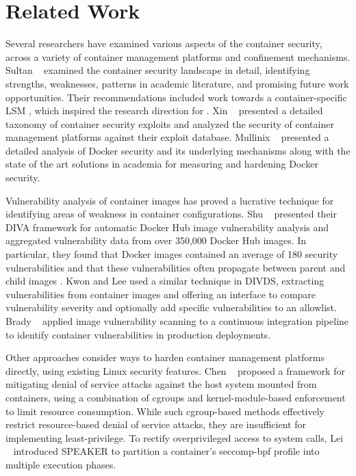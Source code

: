 \section{Related Work}

Several researchers \cite{sultan2019_container_security,xin2018_container_security,mullinix2020_security_measures} have examined various aspects of the container security, across a variety of container management platforms and confinement mechanisms. Sultan \etal~\cite{sultan2019_container_security} examined the container security landscape in detail, identifying strengths, weaknesses, patterns in academic literature,  and promising future work opportunities. Their recommendations included work towards a container-specific LSM \cite{sultan2019_container_security}, which inspired the research direction for \bpfcontain{}. Xin \etal~\cite{xin2018_container_security} presented a detailed taxonomy of container security exploits and analyzed the security of container management platforms against their exploit database. Mullinix \etal~\cite{mullinix2020_security_measures} presented a detailed analysis of Docker security and its underlying mechanisms along with the state of the art solutions in academia for measuring and hardening Docker security.

Vulnerability analysis of container images \cite{shu2017_image_vuln,kwon2020_divds,brady2020_docker_cloud} has proved a lucrative technique for identifying areas of weakness in container configurations. Shu \etal~\cite{shu2017_image_vuln} presented their DIVA framework for automatic Docker Hub image vulnerability analysis and aggregated vulnerability data from over 350,000 Docker Hub images. In particular, they found that Docker images contained an average of 180 security vulnerabilities and that these vulnerabilities often propagate between parent and child images \cite{shu2017_image_vuln}. Kwon and Lee \cite{kwon2020_divds} used a similar technique in DIVDS, extracting vulnerabilities from container images and offering an interface to compare vulnerability severity and optionally add specific vulnerabilities to an allowlist. Brady \etal~\cite{brady2020_docker_cloud} applied image vulnerability scanning to a continuous integration pipeline to identify container vulnerabilities in production deployments.

Other approaches consider ways to harden container management platforms directly, using existing Linux security features. Chen \etal~\cite{chen2019_container_dos} proposed a framework for mitigating denial of service attacks against the host system mounted from containers, using a combination of cgroups and kernel-module-based enforcement to limit resource consumption. While such cgroup-based methods effectively restrict resource-based denial of service attacks, they are insufficient for implementing least-privilege. To rectify overprivileged access to system calls, Lei \etal~\cite{lei2017_speaker} introduced SPEAKER to partition a container's seccomp-bpf profile into multiple execution phases.

